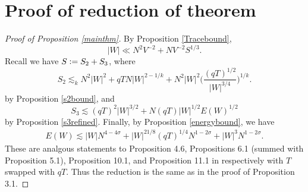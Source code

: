 \section{Proof of reduction of theorem}
\begin{proof}[Proof of Proposition \ref{mainthm}]
    By Proposition \ref{Tracebound},
\[    |W|\ll N^2 V^{-2} + N V^{-2} S^{1/3}.\]
Recall we have $S\mathrel{\mathop:}= S_2+S_3$, where 
\[
    S_2 \lesssim_k N^2|W|^2 + qTN|W|^{2-1/k} + N^2|W|^2 \Big(\frac{(qT)^{1/2}}{|W|^{3/4}}\Big)^{1/k}.
\]
    by Proposition \ref{s2bound}, and
    \[
        S_3\lesssim (qT)^2|W|^{3/2} + N(qT)|W|^{1/2}E(W)^{1/2} 
    \]
    by Proposition \ref{s3refined}.
    Finally, by Proposition \ref{energybound}, we have
    \begin{align*}
E(W)\lesssim |W|N^{4-4\sigma}+|W|^{21/8}(qT)^{1/4}N^{1-2\sigma}+|W|^3N^{1-2\sigma}.
    \end{align*}
    These are analgous statements to Proposition 4.6, Propositions 6.1 (summed with Proposition 5.1), Proposition 10.1, and Proposition 11.1 in \cite{GM2024} respectively with 
    $T$ swapped with $qT$. Thus the reduction is the same as in the proof of Proposition 3.1.
\end{proof}
